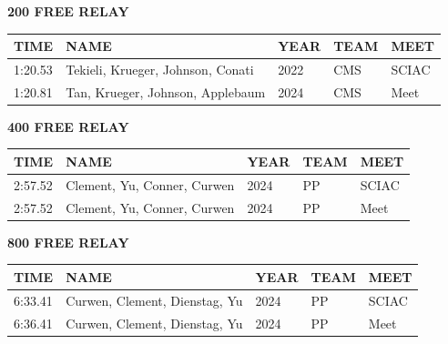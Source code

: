 \begin{table}[H]
\centering
\begin{minipage}[t]{0.6\textwidth}
\centering
\textbf{200 FREE RELAY}\\[0.1cm]
\begin{tabular}{@{}p{1.8cm}p{2.8cm}p{1.2cm}p{1.4cm}p{1.4cm}@{}}
\hline
    \textbf{TIME} & \textbf{NAME} & \textbf{YEAR} & \textbf{TEAM} & \textbf{MEET} \\
\hline
    1:20.53 & Tekieli, Krueger, Johnson, Conati & 2022 & CMS & SCIAC \\
    1:20.81 & Tan, Krueger, Johnson, Applebaum & 2024 & CMS & Meet \\
\hline
\end{tabular}
\end{minipage}
\end{table}

\begin{table}[H]
\centering
\begin{minipage}[t]{0.6\textwidth}
\centering
\textbf{400 FREE RELAY}\\[0.1cm]
\begin{tabular}{@{}p{1.8cm}p{2.8cm}p{1.2cm}p{1.4cm}p{1.4cm}@{}}
\hline
    \textbf{TIME} & \textbf{NAME} & \textbf{YEAR} & \textbf{TEAM} & \textbf{MEET} \\
\hline
    2:57.52 & Clement, Yu, Conner, Curwen & 2024 & PP & SCIAC \\
    2:57.52 & Clement, Yu, Conner, Curwen & 2024 & PP & Meet \\
\hline
\end{tabular}
\end{minipage}
\end{table}

\begin{table}[H]
\centering
\begin{minipage}[t]{0.6\textwidth}
\centering
\textbf{800 FREE RELAY}\\[0.1cm]
\begin{tabular}{@{}p{1.8cm}p{2.8cm}p{1.2cm}p{1.4cm}p{1.4cm}@{}}
\hline
    \textbf{TIME} & \textbf{NAME} & \textbf{YEAR} & \textbf{TEAM} & \textbf{MEET} \\
\hline
    6:33.41 & Curwen, Clement, Dienstag, Yu & 2024 & PP & SCIAC \\
    6:36.41 & Curwen, Clement, Dienstag, Yu & 2024 & PP & Meet \\
\hline
\end{tabular}
\end{minipage}
\end{table}

